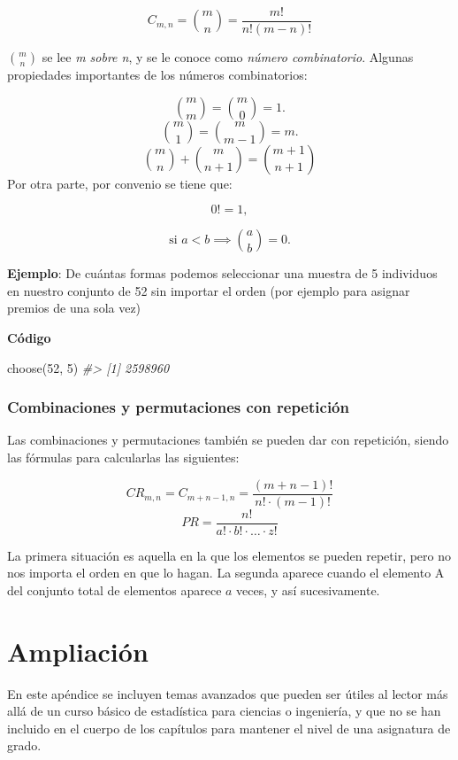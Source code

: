 \documentclass[
]{book}
\newenvironment{Shaded}{\begin{snugshade}}{\end{snugshade}}
\newcommand{\CommentTok}[1]{\textcolor[rgb]{0.56,0.35,0.01}{\textit{#1}}}
\newcommand{\DecValTok}[1]{\textcolor[rgb]{0.00,0.00,0.81}{#1}}
\newcommand{\FunctionTok}[1]{\textcolor[rgb]{0.00,0.00,0.00}{#1}}
\newcommand{\NormalTok}[1]{#1}
\begin{document}
\[\mathit{C}_{m,n} = \binom{m}{n} = \frac{m!}{n!(m-n)!}\]

\(\binom{m}{n}\) se lee \emph{m sobre n}, y se le conoce como \emph{número combinatorio}.
Algunas propiedades importantes de los números combinatorios:

\[\binom{m}{m} = \binom{m}{0} = 1.\]
\[\binom{m}{1} = \binom{m}{m-1} = m.\]
\[\binom{m}{n} + \binom{m}{n+1} = \binom{m+1}{n+1}\]
Por otra parte, por convenio se tiene que:

\[0!=1,\]

\[\text{si } a <b \implies \binom{a}{b} = 0.\]

\textbf{Ejemplo}: De cuántas formas podemos seleccionar una muestra
de 5 individuos en nuestro conjunto de 52 sin importar el orden (por
ejemplo para asignar premios de una sola vez)

\textbf{Código}

\begin{Shaded}
\begin{Highlighting}[]
\FunctionTok{choose}\NormalTok{(}\DecValTok{52}\NormalTok{, }\DecValTok{5}\NormalTok{)}
\CommentTok{\#\textgreater{} [1] 2598960}
\end{Highlighting}
\end{Shaded}

\hypertarget{combinaciones-y-permutaciones-con-repeticiuxf3n}{%
\subsection{Combinaciones y permutaciones con repetición}\label{combinaciones-y-permutaciones-con-repeticiuxf3n}}

Las combinaciones y
permutaciones también se pueden dar con repetición, siendo las fórmulas
para calcularlas las siguientes:

\[\mathit{CR}_{m,n}= \mathit{C}_{m+n-1,n}= \frac{(m+n-1)!}{n!\cdot(m-1)!}\]
\[\mathit{PR} = \frac{n!}{a!\cdot b!\cdot \ldots\cdot z!}\]

La primera situación es aquella en la que los
elementos se pueden repetir, pero no nos importa el orden en que lo
hagan. La segunda aparece cuando el elemento A del conjunto total de
elementos aparece \(a\) veces, y así sucesivamente.

\hypertarget{ampliaciuxf3n}{%
\chapter{Ampliación}\label{ampliaciuxf3n}}

En este apéndice se incluyen temas avanzados que pueden ser útiles al lector
más allá de un curso básico de estadística para ciencias o ingeniería, y
que no se han incluido en el cuerpo de los capítulos para mantener el nivel
de una asignatura de grado.
\end{document}
